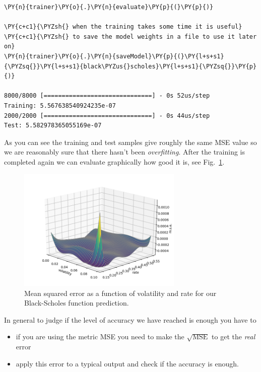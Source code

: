 \begin{tcolorbox}[breakable, size=fbox, boxrule=1pt, pad at break*=1mm,colback=cellbackground, colframe=cellborder]
\begin{Verbatim}[commandchars=\\\{\}]
\PY{n}{trainer}\PY{o}{.}\PY{n}{evaluate}\PY{p}{(}\PY{p}{)}
	
\PY{c+c1}{\PYZsh{} when the training takes some time it is useful}
\PY{c+c1}{\PYZsh{} to save the model weights in a file to use it later on}
\PY{n}{trainer}\PY{o}{.}\PY{n}{saveModel}\PY{p}{(}\PY{l+s+s1}{\PYZsq{}}\PY{l+s+s1}{black\PYZus{}scholes}\PY{l+s+s1}{\PYZsq{}}\PY{p}{)}

8000/8000 [==============================] - 0s 52us/step
Training: 5.567638540924235e-07
2000/2000 [==============================] - 0s 44us/step
Test: 5.582978365055169e-07
\end{Verbatim}
\end{tcolorbox}

As you can see the training and test samples give roughly the same MSE
value so we are reasonably sure that there hasn't been
\emph{overfitting}.
After the training is completed again we can
evaluate graphically how good it is, see Fig.~\ref{fig:vol_rate}. 

\begin{figure}[htb]
	\centering
	\includegraphics[width=0.7\textwidth]{figures/vol_rate}
	\caption{Mean squared error as a function of volatility and rate for our Black-Scholes function prediction.}
	\label{fig:vol_rate}
\end{figure}

In general to judge if the level of accuracy we have reached is enough
you have to

\begin{itemize}
	\tightlist
	\item
	if you are using the metric MSE you need to make the
	\(\sqrt{\mathrm{MSE}}\) to get the \emph{real} error
	\item
	apply this error to a typical output and check if the accuracy is
	enough.
\end{itemize}

